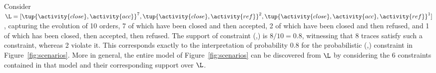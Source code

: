 \begin{example}
  Consider $\L = [\tup{\activity{close},\activity{acc}}^7,\tup{\activity{close},\activity{ref}}^2,\tup{\activity{close},\activity{acc},\activity{ref}}^1]$, capturing the evolution of 10 orders, 7 of which have been closed and then accepted, 2 of which have been closed and then refused, and 1 of which has been closed, then accepted, then refused. The support of constraint (,) is $8/10 = 0.8$, witnessing that 8 traces satisfy such a constraint, whereas 2 violate it. This corresponds exactly to the interpretation of probability $0.8$ for the probabilistic (,) constraint in Figure~\ref{fig:scenarios}. More in general, the entire \pdeclare model of Figure~\ref{fig:scenarios} can be discovered from $\L$ by considering the 6 constraints contained in that model and their corresponding support over $\L$.
\end{example}

